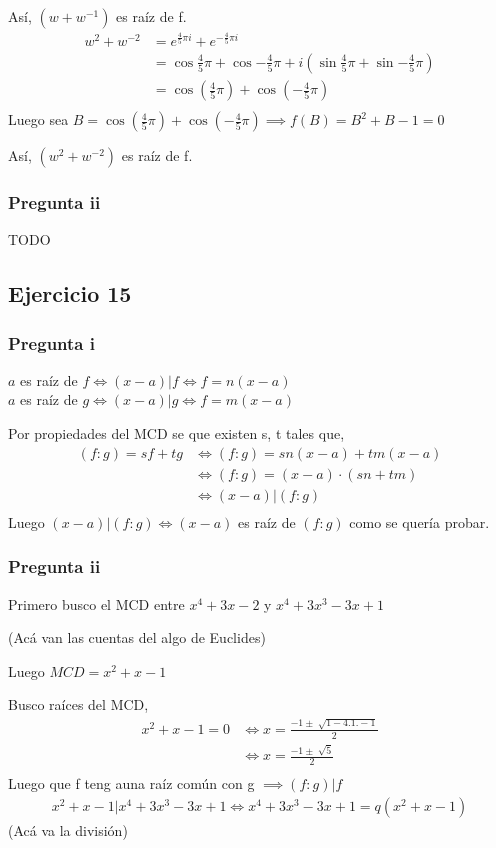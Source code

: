 Así, $ (w+w^{-1}) $ es raíz de f.
\begin{align*}
    w^2 + w^{-2} &= e^{\frac{4}{5} \pi i} + e^{-\frac{4}{5} \pi i} \\
    &= \cos{\frac{4}{5} \pi} + \cos{-\frac{4}{5} \pi} + i\left( \sin{\frac{4}{5} \pi} + \sin{-\frac{4}{5} \pi} \right) \\
    &= \cos{(\frac{4}{5} \pi)} + \cos{(-\frac{4}{5} \pi)} \\
\end{align*}
Luego sea $ B = \cos{(\frac{4}{5} \pi)} + \cos{(-\frac{4}{5} \pi)} \implies f(B) = B^2 + B - 1 = 0 $ 

Así, $ (w^2 + w^{-2}) $ es raíz de f.

\subsubsection{Pregunta ii}
TODO

\subsection{Ejercicio 15}
\subsubsection{Pregunta i}

$a$ es raíz de $f \iff (x-a)|f \iff f = n(x-a) $ \\
$a$ es raíz de $g \iff (x-a)|g \iff f = m(x-a) $ 

Por propiedades del MCD se que existen s, t tales que,
\begin{align*}
    (f:g) = sf + tg &\iff (f:g) = sn(x-a) + tm(x-a) \\
    &\iff (f:g) = (x-a) \cdot (sn + tm) \\
    &\iff (x-a)|(f:g) \\
\end{align*}
Luego $ (x-a)|(f:g) \iff (x-a) $ es raíz de $ (f:g) $ como se quería probar.

\subsubsection{Pregunta ii}

Primero busco el MCD entre $ x^4 + 3x - 2 $ y $ x^4 + 3x^3 - 3x + 1 $

(Acá van las cuentas del algo de Euclides)

Luego $ MCD = x^2 + x - 1 $

Busco raíces del MCD,
\begin{align*}
    x^2 + x - 1 = 0 &\iff x = \frac{-1 \pm \sqrt[]{1-4.1.-1}}{2} \\
    &\iff x = \frac{-1 \pm \sqrt[]{5}}{2} \\
\end{align*}
Luego que f teng auna raíz común con g $ \implies (f:g)|f $
\begin{align*}
    x^2 + x - 1 | x^4 + 3x^3 - 3x + 1 \iff x^4 + 3x^3 - 3x + 1 = q(x^2 + x - 1)
\end{align*}
(Acá va la división)

